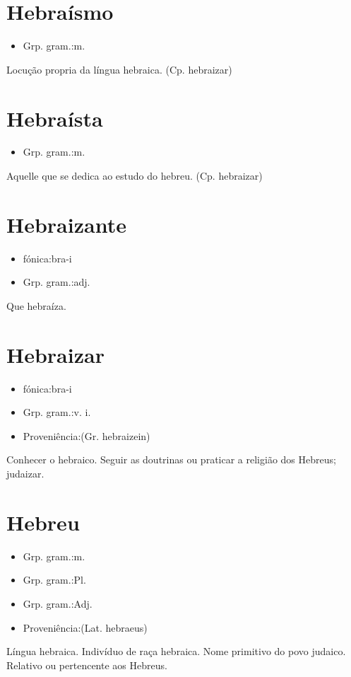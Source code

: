 \documentclass{article}
\begin{document}
\section{Hebraísmo}
\begin{itemize}
\item {Grp. gram.:m.}
\end{itemize}
Locução propria da língua hebraica.
(Cp. \textunderscore hebraizar\textunderscore )
\section{Hebraísta}
\begin{itemize}
\item {Grp. gram.:m.}
\end{itemize}
Aquelle que se dedica ao estudo do hebreu.
(Cp. \textunderscore hebraizar\textunderscore )
\section{Hebraizante}
\begin{itemize}
\item {fónica:bra-i}
\end{itemize}
\begin{itemize}
\item {Grp. gram.:adj.}
\end{itemize}
Que hebraíza.
\section{Hebraizar}
\begin{itemize}
\item {fónica:bra-i}
\end{itemize}
\begin{itemize}
\item {Grp. gram.:v. i.}
\end{itemize}
\begin{itemize}
\item {Proveniência:(Gr. \textunderscore hebraizein\textunderscore )}
\end{itemize}
Conhecer o hebraico.
Seguir as doutrinas ou praticar a religião dos Hebreus; judaizar.
\section{Hebreu}
\begin{itemize}
\item {Grp. gram.:m.}
\end{itemize}
\begin{itemize}
\item {Grp. gram.:Pl.}
\end{itemize}
\begin{itemize}
\item {Grp. gram.:Adj.}
\end{itemize}
\begin{itemize}
\item {Proveniência:(Lat. \textunderscore hebraeus\textunderscore )}
\end{itemize}
Língua hebraica.
Indivíduo de raça hebraica.
Nome primitivo do povo judaico.
Relativo ou pertencente aos Hebreus.
\end{document}
